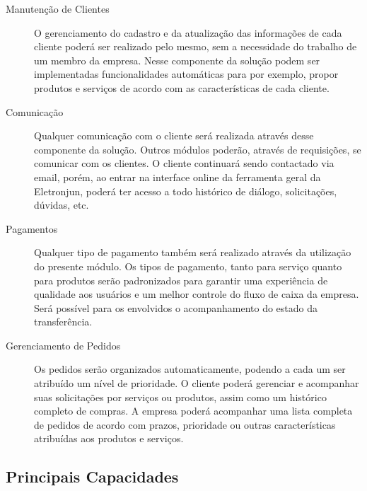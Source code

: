       \begin{description}
        \item[Manutenção de Clientes] O gerenciamento do cadastro e da atualização das informações de cada cliente poderá ser realizado pelo mesmo, sem a necessidade do trabalho de um membro da empresa. Nesse componente da solução podem ser implementadas funcionalidades automáticas para por exemplo, propor produtos e serviços de acordo com as características de cada cliente.
        \item[Comunicação] Qualquer comunicação com o cliente será realizada através desse componente da solução. Outros módulos poderão, através de requisições, se comunicar com os clientes. O cliente continuará sendo contactado via email, porém, ao entrar na interface online da ferramenta geral da Eletronjun, poderá ter acesso a todo histórico de diálogo, solicitações, dúvidas, etc.
        \item[Pagamentos] Qualquer tipo de pagamento também será realizado através da utilização do presente módulo. Os tipos de pagamento, tanto para serviço quanto para produtos serão padronizados para garantir uma experiência de qualidade aos usuários e um melhor controle do fluxo de caixa da empresa. Será possível para os envolvidos o acompanhamento do estado da transferência.
        \item[Gerenciamento de Pedidos] Os pedidos serão organizados automaticamente, podendo a cada um ser atribuído um nível de prioridade. O cliente poderá gerenciar e acompanhar suas solicitações por serviços ou produtos, assim como um histórico completo de compras. A empresa poderá acompanhar uma lista completa de pedidos de acordo com prazos, prioridade ou outras características atribuídas aos produtos e serviços.
      \end{description}

    \subsection{Principais Capacidades}
      
